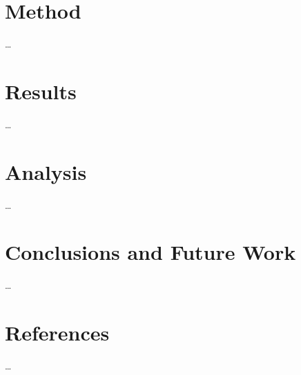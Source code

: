 \documentclass[oneside]{bthdiss} %
\begin{document}
\chapter{Method}
\ldots

\chapter{Results}
\ldots

\chapter{Analysis}
\ldots

\chapter{Conclusions and Future Work}
\ldots

\chapter*{References}
\ldots
\end{document}
